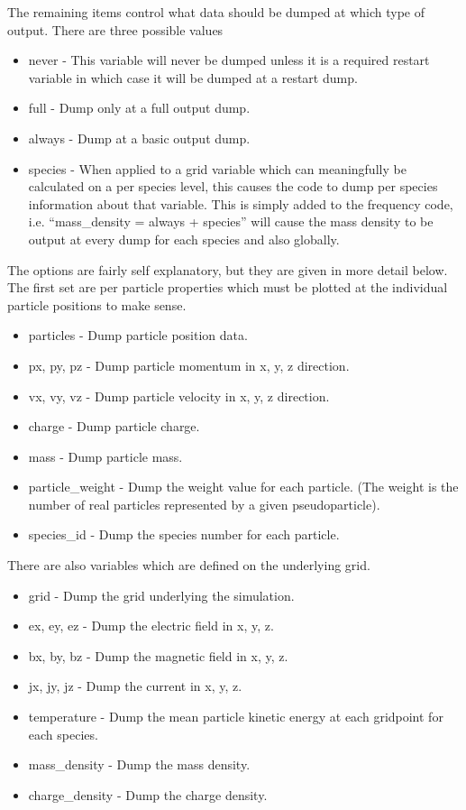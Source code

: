 \documentclass[12pt,a4paper]{article}
\begin{document}
The remaining items control what data should be dumped at which type of
output. There are three possible values\\
\begin{itemize}
\item never - This variable will never be dumped unless it is a required restart
  variable in which case it will be dumped at a restart dump.
\item full - Dump only at a full output dump.
\item always - Dump at a basic output dump.
\item species - When applied to a grid variable which can meaningfully be
  calculated on a per species level, this causes the code to dump per species
  information about that variable. This is simply added to the frequency code,
  i.e. ``mass\_density = always + species'' will cause the mass density to be
  output at every dump for each species and also globally.
\end{itemize}

The options are fairly self explanatory, but they are given in more detail
below. The first set are per particle properties which must be plotted at the
individual particle positions to make sense.\\
\begin{itemize}
\item particles - Dump particle position data.
\item px, py, pz - Dump particle momentum in x, y, z direction.
\item vx, vy, vz - Dump particle velocity in x, y, z direction.
\item charge - Dump particle charge.
\item mass - Dump particle mass.
\item particle\_weight - Dump the weight value for each particle. (The weight
  is the number of real particles represented by a given pseudoparticle).
\item species\_id - Dump the species number for each particle.
\end{itemize}

There are also variables which are defined on the underlying grid.\\
\begin{itemize}
\item grid - Dump the grid underlying the simulation.
\item ex, ey, ez - Dump the electric field in x, y, z.
\item bx, by, bz - Dump the magnetic field in x, y, z.
\item jx, jy, jz - Dump the current in x, y, z.
\item temperature - Dump the mean particle kinetic energy at each gridpoint
  for each species.
\item mass\_density - Dump the mass density.
\item charge\_density - Dump the charge density.
\end{itemize}
\end{document}
